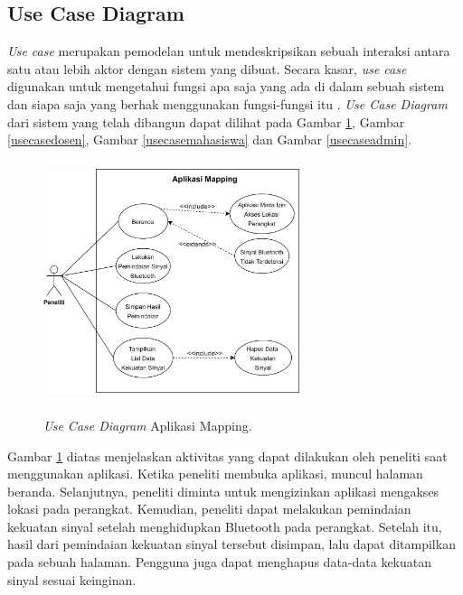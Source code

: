 \begin{enumerate}[a.]
\subsection{Use Case Diagram}
\textit{Use case} merupakan pemodelan untuk mendeskripsikan sebuah interaksi antara satu atau lebih aktor dengan sistem yang dibuat. Secara kasar, \textit{use case} digunakan untuk mengetahui fungsi apa saja yang ada di dalam sebuah sistem dan siapa saja yang berhak menggunakan fungsi-fungsi itu \citep{Rosa2015}. \textit{Use Case Diagram} dari sistem yang telah dibangun dapat dilihat pada Gambar \ref{usecasemapping}, Gambar \ref{usecasedosen}, Gambar \ref{usecasemahasiswa} dan Gambar \ref{usecaseadmin}.

\begin{figure}[H]
	\center
	\shadowbox
	{\includegraphics [width=7.5cm, height=7cm]{gambar/model/use-case-mapping}}
	\caption{\textit{Use Case Diagram} Aplikasi Mapping.}
	\label{usecasemapping}
\end{figure}

\par Gambar \ref{usecasemapping} diatas menjelaskan aktivitas yang dapat dilakukan oleh peneliti saat menggunakan aplikasi. Ketika peneliti membuka aplikasi, muncul halaman beranda. Selanjutnya, peneliti diminta untuk mengizinkan aplikasi mengakses lokasi pada perangkat. Kemudian, peneliti dapat melakukan pemindaian kekuatan sinyal setelah menghidupkan Bluetooth pada perangkat. Setelah itu, hasil dari pemindaian kekuatan sinyal tersebut disimpan, lalu dapat ditampilkan pada sebuah halaman. Pengguna juga dapat menghapus data-data kekuatan sinyal sesuai keinginan.
\fancyhf{}
\fancyfoot[R]{\thepage}


\end{enumerate}
